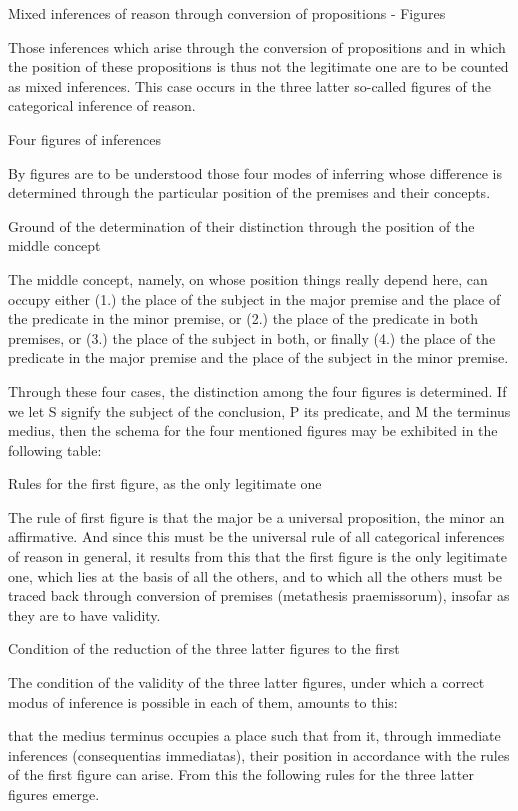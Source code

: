 Mixed inferences of reason through conversion of
propositions - Figures

Those inferences which arise through the conversion of propositions
and in which the position of these propositions is thus
not the legitimate one
are to be counted as mixed inferences.
This case occurs in the three latter so-called
figures of the categorical inference of reason.

Four figures of inferences

By figures are to be understood those four modes of inferring whose
difference is determined through the particular position of the premises
and their concepts.

Ground of the determination of their distinction
through the position of the middle concept

The middle concept, namely,
on whose position things really depend here,
can occupy either
(1.)    the place of the subject in the major premise
        and the place of the predicate in the minor premise, or
(2.)    the place of the predicate in both premises, or
(3.)    the place of the subject in both, or finally
(4.)    the place of the predicate in the major premise
        and the place of the subject in the minor premise.

Through these four cases,
the distinction among the four figures is determined.
If we let S signify the subject of the conclusion,
P its predicate,
and M the terminus medius,
then the schema for the four mentioned figures
may be exhibited in the following table:

Rules for the first figure, as the only legitimate one

The rule of first figure is that
the major be a universal proposition,
the minor an affirmative.
And since this must be the universal rule of
all categorical inferences of reason in general,
it results from this that
the first figure is the only legitimate one,
which lies at the basis of all the others,
and to which all the others must be traced back
through conversion of premises (metathesis praemissorum),
insofar as they are to have validity.

Condition of the reduction of the three latter figures to the first

The condition of the validity of the three latter figures,
under which a correct modus of inference is possible in each of them,
amounts to this:

that the medius terminus occupies a place such that from it,
through immediate inferences (consequentias immediatas),
their position in accordance with the rules of the first figure can arise.
From this the following rules for the three latter figures emerge.

